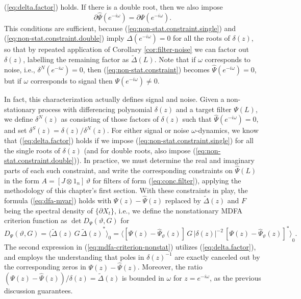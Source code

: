 \documentclass[a4paper]{book}
\begin{document}
  (\ref{eq:delta.factor}) holds. If there is a double root, then we also impose
 \begin{equation}
\label{eq:non-stat.constraint.double}
 \partial \widehat{\Psi} (e^{-i \omega}) = \partial \Psi (e^{-i \omega}).
 \end{equation}
   This conditions are sufficient, because 
  (\ref{eq:non-stat.constraint.single}) and  (\ref{eq:non-stat.constraint.double})
    imply $\Delta (e^{-i \omega}) = 0$
  for all the roots of $\delta (z)$, so that by repeated application of Corollary 
 \ref{cor:filter-noise} we can factor out $\delta (z)$, labelling the
 remaining factor as $\widetilde{\Delta } (L)$.  
   Note that if $\omega$ corresponds to noise, i.e., $\delta^N (e^{-i \omega}) = 0$,
    then (\ref{eq:non-stat.constraint}) becomes 
  $ \widehat{\Psi} (e^{-i \omega}) = 0$, but if $\omega$ corresponds to signal
  then $\Psi (e^{-i \omega}) \neq 0$. 
  
  In fact, this characterization actually
  defines signal and noise.   Given a non-stationary process with differencing
  polynomial $\delta (z)$ and a target filter $\Psi (L)$, we define $\delta^N (z)$
  as consisting of those factors of $\delta (z)$ such that
   $ \widehat{\Psi} (e^{-i \omega}) = 0$, and set $\delta^S (z) = \delta (z)/ \delta^N (z)$.
  For either signal or noise $\omega$-dynamics, we know that 
  (\ref{eq:delta.factor}) holds if we impose  (\ref{eq:non-stat.constraint.single}) for all
   the single roots of $\delta (z)$
   (and for double roots, also impose  (\ref{eq:non-stat.constraint.double})).
 In practice, we must determine the real and imaginary  parts of each such 
 constraint, and write the corresponding constraints on $\widehat{\Psi} (L)$ 
 in the form $A = [J \otimes 1_n] \, \vartheta$ for
  filters of form (\ref{eq:conc.filter}), applying the methodology 
  of this chapter's first section.  With these constraints in play, 
   the formula (\ref{eq:dfa-mvar}) holds with $\Psi (z) - \widehat{\Psi} (z)$
   replaced by $\widetilde{\Delta} (z)$
 and $F$ being the spectral density of $\{ \partial X_t \}$, i.e., 
 we define the nonstationary MDFA criterion
 function as $\det D_{\Psi } (\vartheta, G)$ for
\begin{equation}
\label{eq:mdfa-criterion-nonstat}
 D_{\Psi} (\vartheta, G) =     { \langle  \widetilde{\Delta} (z)   \, 
 G \,  {\widetilde{\Delta} (z) }^*   \rangle }_0
 = { \langle  \left[ \Psi (z) -   \widehat{\Psi}_{\vartheta} (z) \right] \, 
 G \, {|\delta (z) |}^{-2} \,
  {  \left[ \Psi (z) -  \widehat{\Psi}_{\vartheta} (z) \right] }^{*} \rangle }_0.
\end{equation}
  The second expression in (\ref{eq:mdfa-criterion-nonstat}) 
  utilizes (\ref{eq:delta.factor}), and employs the understanding
 that poles in ${\delta (z) }^{-1}$ are exactly canceled out by the 
 corresponding zeros in $\Psi (z) - \widehat{\Psi} (z)$.
  Moreover, the ratio $(\Psi (z) - \widehat{\Psi} (z))/\delta (z) = 
  \widetilde{\Delta} (z)$ is bounded in $\omega$ for $z = e^{-i \omega}$,
 as the previous discussion guarantees. 
 
\end{document}
